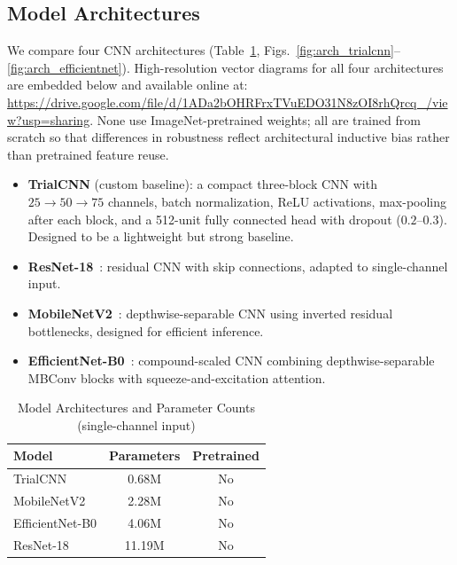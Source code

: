 \documentclass[conference]{IEEEtran}
\begin{document}
\subsection{Model Architectures}
\label{sec:archs}
We compare four CNN architectures (Table~\ref{tab:architectures}, Figs.~\ref{fig:arch_trialcnn}--\ref{fig:arch_efficientnet}). High-resolution vector diagrams for all four architectures are embedded below and available online at: \url{https://drive.google.com/file/d/1ADa2bOHRFrxTVuEDO31N8zOI8rhQrcq_/view?usp=sharing}. None use ImageNet-pretrained weights; all are trained from scratch so that differences in robustness reflect architectural inductive bias rather than pretrained feature reuse.
\begin{itemize}
    \item \textbf{TrialCNN} (custom baseline): a compact three-block CNN with $25\!\to\!50\!\to\!75$ channels, batch normalization, ReLU activations, max-pooling after each block, and a 512-unit fully connected head with dropout ($0.2$--$0.3$). Designed to be a lightweight but strong baseline.
    \item \textbf{ResNet-18}~\cite{resnet}: residual CNN with skip connections, adapted to single-channel input.
    \item \textbf{MobileNetV2}~\cite{mobilenetv2}: depthwise-separable CNN using inverted residual bottlenecks, designed for efficient inference.
    \item \textbf{EfficientNet-B0}~\cite{efficientnet}: compound-scaled CNN combining depthwise-separable MBConv blocks with squeeze-and-excitation attention.
\end{itemize}

\begin{table}[htbp]
\caption{Model Architectures and Parameter Counts (single-channel input)}
\label{tab:architectures}
\begin{center}
\begin{tabular}{lcc}
\toprule
\textbf{Model} & \textbf{Parameters} & \textbf{Pretrained} \\
\midrule
TrialCNN         & 0.68M  & No \\
MobileNetV2      & 2.28M  & No \\
EfficientNet-B0  & 4.06M  & No \\
ResNet-18        & 11.19M & No \\
\bottomrule
\end{tabular}
\end{center}
\end{table}
\end{document}

